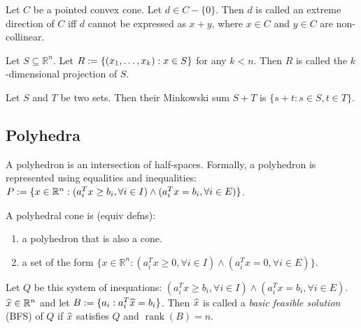 \documentclass[a4paper, 12pt, fleqn]{article}
\newenvironment*{tightenum}{\begin{enumerate}[noitemsep]}{\end{enumerate}}
\DeclareMathOperator{\rank}{rank}
\begin{document}
\begin{definition}
Let $C$ be a pointed convex cone. Let $d \in C - \{0\}$.
Then $d$ is called an extreme direction of $C$ iff
$d$ cannot be expressed as $x + y$, where $x \in C$ and $y \in C$ are non-collinear.
\end{definition}

\begin{definition}[Projection]
Let $S \subseteq \mathbb{R}^n$. Let $R := \{(x_1, \ldots, x_k): x \in S\}$ for any $k < n$.
Then $R$ is called the $k$-dimensional projection of $S$.
\end{definition}

\begin{definition}
Let $S$ and $T$ be two sets. Then their Minkowski sum $S + T$ is $\{s + t: s \in S, t \in T\}$.
\end{definition}

\subsection{Polyhedra}

\begin{definition}[Polyhedron]
\label{defn:polyhedron}
A polyhedron is an intersection of half-spaces.
Formally, a polyhedron is represented using equalities and inequalities:
$P := \{x \in \mathbb{R}^n: (a_i^Tx \ge b_i, \forall i \in I) \wedge (a_i^Tx = b_i, \forall i \in E)\}$.
\end{definition}

\begin{definition}
A polyhedral cone is (equiv defns):
\begin{tightenum}
\item a polyhedron that is also a cone.
\item a set of the form
$\{x \in \mathbb{R}^n: (a_i^Tx \ge 0, \forall i \in I) \wedge (a_i^Tx = 0, \forall i \in E)\}$.
\end{tightenum}
\end{definition}

\begin{definition}[BFS]
Let $Q$ be this system of inequations:
$(a_i^Tx \ge b_i, \forall i \in I) \wedge (a_i^Tx = b_i, \forall i \in E)$.
$\widehat{x} \in \mathbb{R}^n$ and let $B := \{a_i: a_i^T\widehat{x} = b_i\}$.
Then $\widehat{x}$ is called a \emph{basic feasible solution} (BFS) of $Q$
if $\widehat{x}$ satisfies $Q$ and $\rank(B) = n$.
\end{definition}
\end{document}
